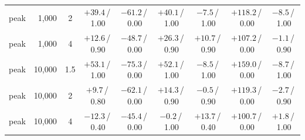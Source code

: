 \begin{tabular}{l r c c c c c c c}
peak & 1{,}000 & 2 & ${+}39.4$\,/\,1.00 & $-61.2$\,/\,0.00 & ${+}40.1$\,/\,1.00 & $-7.5$\,/\,1.00 & ${+}118.2$\,/\,0.00 & $-8.5$\,/\,1.00 \\
peak & 1{,}000 & 4 & ${+}12.6$\,/\,0.90 & $-48.7$\,/\,0.00 & ${+}26.3$\,/\,0.90 & ${+}10.7$\,/\,0.90 & ${+}107.2$\,/\,0.00 & $-1.1$\,/\,0.90 \\
peak & 10{,}000 & 1.5 & ${+}53.1$\,/\,1.00 & $-75.3$\,/\,0.00 & ${+}52.1$\,/\,1.00 & $-8.5$\,/\,1.00 & ${+}159.0$\,/\,0.00 & $-8.7$\,/\,1.00 \\
peak & 10{,}000 & 2 & ${+}9.7$\,/\,0.80 & $-62.1$\,/\,0.00 & ${+}14.3$\,/\,0.90 & $-0.5$\,/\,0.90 & ${+}119.3$\,/\,0.00 & $-2.7$\,/\,0.90 \\
peak & 10{,}000 & 4 & $-12.3$\,/\,0.40 & $-45.4$\,/\,0.00 & $-0.2$\,/\,1.00 & ${+}13.7$\,/\,0.40 & ${+}100.7$\,/\,0.00 & ${+}1.8$\,/\,1.00 \\
\bottomrule
\end{tabular}
